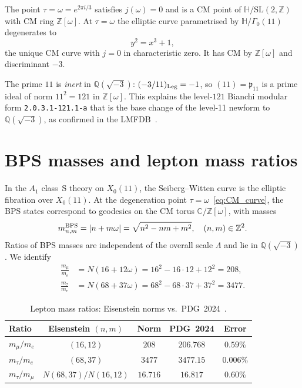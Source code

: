 \documentclass[11pt,a4paper]{article}
\theoremstyle{remark}
\newcommand{\Z}{\mathbb{Z}}
\newcommand{\C}{\mathbb{C}}
\newcommand{\Q}{\mathbb{Q}}
\begin{document}
The point $\tau=\omega=e^{2\pi i/3}$ satisfies $j(\omega)=0$ and is a
CM point of $\mathbb{H}/\mathrm{SL}(2,\Z)$ with CM ring $\Z[\omega]$.
At $\tau=\omega$ the elliptic curve parametrised by $\mathbb{H}/\Gamma_0(11)$
degenerates to
\begin{equation}
y^2=x^3+1,
\label{eq:CM_curve}
\end{equation}
the unique CM curve with $j=0$ in characteristic zero.
It has CM by $\Z[\omega]$ and discriminant $-3$.

The prime $11$ is \emph{inert} in $\Q(\sqrt{-3})$:
$(-3/11)_{\rm Leg}=-1$, so $(11)=\mathfrak{p}_{11}$ is a prime ideal
of norm $11^2=121$ in $\Z[\omega]$.
This explains the level-$121$ Bianchi modular form
\texttt{2.0.3.1-121.1-a} that is the base change of the
level-11 newform to $\Q(\sqrt{-3})$, as confirmed in the
LMFDB~\cite{LMFDB}.

\section{BPS masses and lepton mass ratios}
\label{sec:BPS}

In the $A_1$ class~S theory on $X_0(11)$, the Seiberg--Witten curve
is the elliptic fibration over $X_0(11)$.
At the degeneration point $\tau=\omega$~\eqref{eq:CM_curve}, the BPS
states correspond to geodesics on the CM torus $\C/\Z[\omega]$, with masses
\begin{equation}
m_{n,m}^{\rm BPS}=|n+m\omega|=\sqrt{n^2-nm+m^2},\quad (n,m)\in\Z^2.
\end{equation}
Ratios of BPS masses are independent of the overall scale $\Lambda$
and lie in $\Q(\sqrt{-3})$.
We identify
\begin{align}
\frac{m_\mu}{m_e}&=N(16+12\omega)=16^2-16\cdot12+12^2=208,\\
\frac{m_\tau}{m_e}&=N(68+37\omega)=68^2-68\cdot37+37^2=3477.
\end{align}

\begin{table}[htbp]
\centering
\caption{Lepton mass ratios: Eisenstein norms vs.\ PDG~2024~\cite{PDG2024}.}
\label{tab:lepton}
\begin{tabular}{lcccc}
\toprule
Ratio & Eisenstein $(n,m)$ & Norm & PDG~2024 & Error \\
\midrule
$m_\mu/m_e$ & $(16,12)$ & $208$ & $206.768$ & $0.59\%$ \\
$m_\tau/m_e$ & $(68,37)$ & $3477$ & $3477.15$ & $0.006\%$ \\
$m_\tau/m_\mu$ & $N(68,37)/N(16,12)$ & $16.716$ & $16.817$ & $0.60\%$ \\
\bottomrule
\end{tabular}
\end{table}
\end{document}
